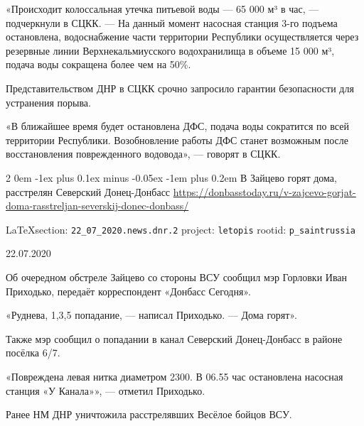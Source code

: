 \documentclass[a4paper,11pt]{extreport}
\makeatletter
\renewcommand\subsection{%
  \clearpage
    \@startsection{subsection}%
    {2}%
    {0em}%
    {-1ex plus 0.1ex minus -0.05ex}%
    {-1em plus 0.2em}%
    {\scshape\bfseries\Large}%
}
\makeatother
\begin{document}
«Происходит колоссальная утечка питьевой воды --- 65 000 м³ в час, --- подчеркнули
в СЦКК. --- На данный момент насосная станция 3-го подъема остановлена,
водоснабжение части территории Республики осуществляется через резервные линии
Верхнекальмиусского водохранилища в объеме 15 000 м³, подача воды сокращена
более чем на 50\%.

Представительством ДНР в СЦКК срочно запросило гарантии безопасности для устранения порыва.

«В ближайшее время будет остановлена ДФС, подача воды сократится по всей
территории Республики. Возобновление работы ДФС станет возможным после
восстановления поврежденного водовода», --- говорят в СЦКК.
  
 
 
\subsection{В Зайцево горят дома, расстрелян Северский Донец-Донбасс}
\label{sec:22_07_2020.news.dnr.2}
\url{https://donbasstoday.ru/v-zajcevo-gorjat-doma-rasstreljan-severskij-donec-donbass/}
  
\vspace{0.5cm}
{\small\LaTeX section: \verb|22_07_2020.news.dnr.2| project: \verb|letopis| rootid: \verb|p_saintrussia|}
\vspace{0.5cm}
  
22.07.2020

Об очередном обстреле Зайцево со стороны ВСУ сообщил мэр Горловки Иван
Приходько, передаёт корреспондент «Донбасс Сегодня».

«Руднева, 1,3,5 попадание, --- написал Приходько. --- Дома горят».

Также мэр сообщил о попадании в канал Северский Донец-Донбасс в районе посёлка
6/7.

«Повреждена левая нитка диаметром 2300. В 06.55 час остановлена насосная
станция «У Канала»», --- отметил Приходько.

Ранее НМ ДНР уничтожила расстрелявших Весёлое бойцов ВСУ.

 
\end{document}
